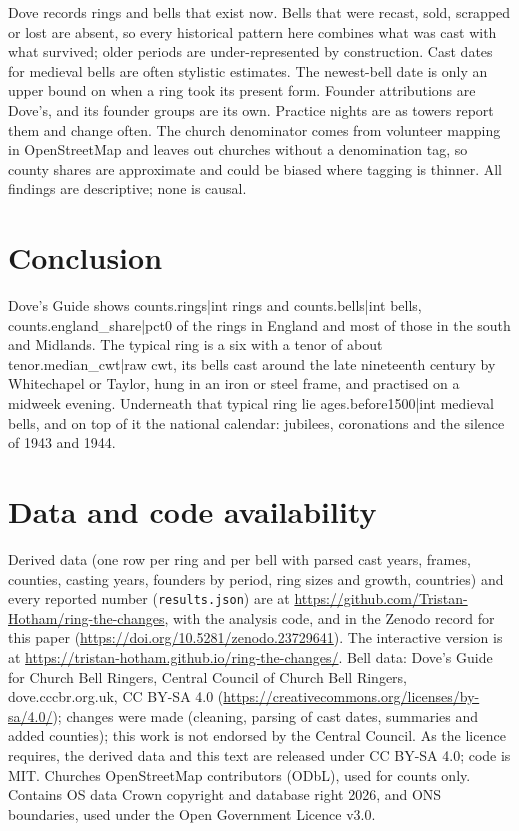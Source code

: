 \documentclass[11pt,a4paper]{article}
\begin{document}
Dove records rings and bells that exist now. Bells that were recast, sold, scrapped or lost are absent, so every historical pattern here combines what was cast with what survived; older periods are under-represented by construction. Cast dates for medieval bells are often stylistic estimates. The newest-bell date is only an upper bound on when a ring took its present form. Founder attributions are Dove's, and its founder groups are its own. Practice nights are as towers report them and change often. The church denominator comes from volunteer mapping in OpenStreetMap and leaves out churches without a denomination tag, so county shares are approximate and could be biased where tagging is thinner. All findings are descriptive; none is causal.

\section{Conclusion}

Dove's Guide shows {{counts.rings|int}} rings and {{counts.bells|int}} bells, {{counts.england_share|pct0}} of the rings in England and most of those in the south and Midlands. The typical ring is a six with a tenor of about {{tenor.median_cwt|raw}} cwt, its bells cast around the late nineteenth century by Whitechapel or Taylor, hung in an iron or steel frame, and practised on a midweek evening. Underneath that typical ring lie {{ages.before1500|int}} medieval bells, and on top of it the national calendar: jubilees, coronations and the silence of 1943 and 1944.

\section*{Data and code availability}

Derived data (one row per ring and per bell with parsed cast years, frames, counties, casting years, founders by period, ring sizes and growth, countries) and every reported number (\texttt{results.json}) are at \url{https://github.com/Tristan-Hotham/ring-the-changes}, with the analysis code, and in the Zenodo record for this paper (\url{https://doi.org/10.5281/zenodo.23729641}). The interactive version is at \url{https://tristan-hotham.github.io/ring-the-changes/}. Bell data: Dove's Guide for Church Bell Ringers, Central Council of Church Bell Ringers, dove.cccbr.org.uk, CC BY-SA 4.0 (\url{https://creativecommons.org/licenses/by-sa/4.0/}); changes were made (cleaning, parsing of cast dates, summaries and added counties); this work is not endorsed by the Central Council. As the licence requires, the derived data and this text are released under CC BY-SA 4.0; code is MIT. Churches \textcopyright{} OpenStreetMap contributors (ODbL), used for counts only. Contains OS data \textcopyright{} Crown copyright and database right 2026, and ONS boundaries, used under the Open Government Licence v3.0.
\end{document}
